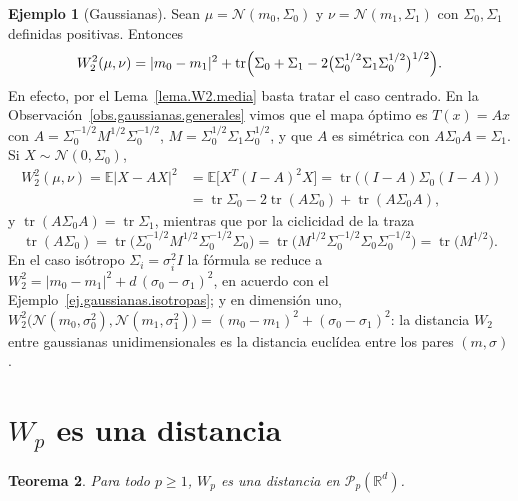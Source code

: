 \documentclass[12pt, a4paper]{amsbook}
\newcommand{\R}{{\mathbb R}}
\newcommand{\E}{{\mathbb E}}
\newtheorem{teo}{Teorema}[section]
\theoremstyle{remark}
\theoremstyle{definition}
\newtheorem{ejem}[teo]{Ejemplo}
\numberwithin{section}{chapter}
\numberwithin{subsection}{section}
\numberwithin{equation}{section}
\numberwithin{figure}{chapter}
\begin{document}
\begin{ejem}[Gaussianas]\label{ej.Wp.gaussianas}
Sean $\mu=\mathcal N(m_0,\Sigma_0)$ y $\nu=\mathcal N(m_1,\Sigma_1)$ con
$\Sigma_0,\Sigma_1$ definidas positivas. Entonces
\begin{equation}\label{eq:W2.gauss}
W_2^2(\mu,\nu)
=|m_0-m_1|^2
+\operatorname{tr}\Bigl(\Sigma_0+\Sigma_1-2\bigl(\Sigma_0^{1/2}\Sigma_1\Sigma_0^{1/2}\bigr)^{1/2}\Bigr).
\end{equation}
En efecto, por el Lema~\ref{lema.W2.media} basta tratar el caso centrado. En
la Observación~\ref{obs.gaussianas.generales} vimos que el mapa óptimo es
$T(x)=Ax$ con $A=\Sigma_0^{-1/2}M^{1/2}\Sigma_0^{-1/2}$, $M=\Sigma_0^{1/2}\Sigma_1\Sigma_0^{1/2}$,
y que $A$ es simétrica con $A\Sigma_0A=\Sigma_1$. Si $X\sim\mathcal N(0,\Sigma_0)$,
\[
\begin{aligned}
W_2^2(\mu,\nu)=\E|X-AX|^2
&=\E\bigl[X^T(I-A)^2X\bigr]
=\operatorname{tr}\bigl((I-A)\Sigma_0(I-A)\bigr)\\
&=\operatorname{tr}\Sigma_0-2\operatorname{tr}(A\Sigma_0)+\operatorname{tr}(A\Sigma_0A),
\end{aligned}
\]
y $\operatorname{tr}(A\Sigma_0A)=\operatorname{tr}\Sigma_1$, mientras que por la
ciclicidad de la traza
\[
\operatorname{tr}(A\Sigma_0)
=\operatorname{tr}\bigl(\Sigma_0^{-1/2}M^{1/2}\Sigma_0^{-1/2}\Sigma_0\bigr)
=\operatorname{tr}\bigl(M^{1/2}\Sigma_0^{-1/2}\Sigma_0\Sigma_0^{-1/2}\bigr)
=\operatorname{tr}\bigl(M^{1/2}\bigr).
\]
En el caso isótropo $\Sigma_i=\sigma_i^2I$ la fórmula se reduce a
$W_2^2=|m_0-m_1|^2+d\,(\sigma_0-\sigma_1)^2$, en acuerdo con el
Ejemplo~\ref{ej.gaussianas.isotropas}; y en dimensión uno,
$W_2^2\bigl(\mathcal N(m_0,\sigma_0^2),\mathcal N(m_1,\sigma_1^2)\bigr)=(m_0-m_1)^2+(\sigma_0-\sigma_1)^2$:
la distancia $W_2$ entre gaussianas unidimensionales es la distancia euclídea
entre los pares $(m,\sigma)$.
\end{ejem}

\section{$W_p$ es una distancia}\label{sec.Wp.distancia}

\begin{teo}\label{teo.Wp.distancia}
Para todo $p\ge1$, $W_p$ es una distancia en $\mathcal P_p(\R^d)$.
\end{teo}
\end{document}
